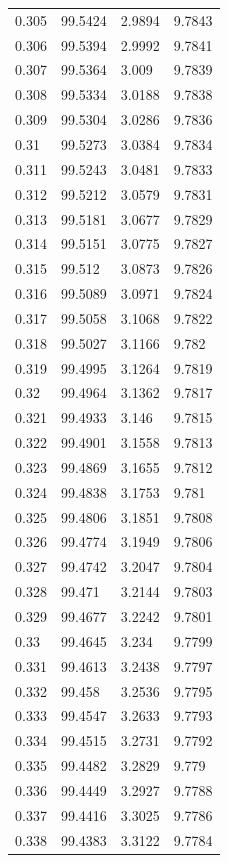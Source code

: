 \begin{tabular}{llll}
0.305 & 99.5424 & 2.9894 & 9.7843 \\
0.306 & 99.5394 & 2.9992 & 9.7841 \\
0.307 & 99.5364 & 3.009 & 9.7839 \\
0.308 & 99.5334 & 3.0188 & 9.7838 \\
0.309 & 99.5304 & 3.0286 & 9.7836 \\
0.31 & 99.5273 & 3.0384 & 9.7834 \\
0.311 & 99.5243 & 3.0481 & 9.7833 \\
0.312 & 99.5212 & 3.0579 & 9.7831 \\
0.313 & 99.5181 & 3.0677 & 9.7829 \\
0.314 & 99.5151 & 3.0775 & 9.7827 \\
0.315 & 99.512 & 3.0873 & 9.7826 \\
0.316 & 99.5089 & 3.0971 & 9.7824 \\
0.317 & 99.5058 & 3.1068 & 9.7822 \\
0.318 & 99.5027 & 3.1166 & 9.782 \\
0.319 & 99.4995 & 3.1264 & 9.7819 \\
0.32 & 99.4964 & 3.1362 & 9.7817 \\
0.321 & 99.4933 & 3.146 & 9.7815 \\
0.322 & 99.4901 & 3.1558 & 9.7813 \\
0.323 & 99.4869 & 3.1655 & 9.7812 \\
0.324 & 99.4838 & 3.1753 & 9.781 \\
0.325 & 99.4806 & 3.1851 & 9.7808 \\
0.326 & 99.4774 & 3.1949 & 9.7806 \\
0.327 & 99.4742 & 3.2047 & 9.7804 \\
0.328 & 99.471 & 3.2144 & 9.7803 \\
0.329 & 99.4677 & 3.2242 & 9.7801 \\
0.33 & 99.4645 & 3.234 & 9.7799 \\
0.331 & 99.4613 & 3.2438 & 9.7797 \\
0.332 & 99.458 & 3.2536 & 9.7795 \\
0.333 & 99.4547 & 3.2633 & 9.7793 \\
0.334 & 99.4515 & 3.2731 & 9.7792 \\
0.335 & 99.4482 & 3.2829 & 9.779 \\
0.336 & 99.4449 & 3.2927 & 9.7788 \\
0.337 & 99.4416 & 3.3025 & 9.7786 \\
0.338 & 99.4383 & 3.3122 & 9.7784 \\

\end{tabular}
